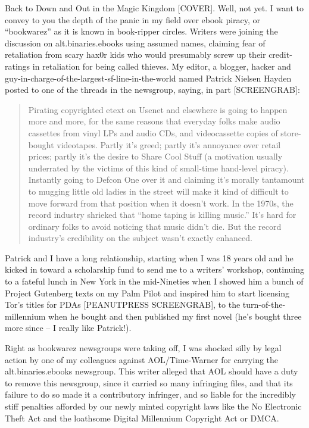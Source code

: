 Back to Down and Out in the Magic Kingdom [COVER]. Well, not yet. I
want to convey to you the depth of the panic in my field over ebook
piracy, or ``bookwarez'' as it is known in book-ripper circles.
Writers were joining the discussion on alt.binaries.ebooks using
assumed names, claiming fear of retaliation from scary hax0r kids
who would presumably screw up their credit-ratings in retaliation
for being called thieves. My editor, a blogger, hacker and
guy-in-charge-of-the-largest-sf-line-in-the-world named Patrick
Nielsen Hayden posted to one of the threads in the newsgroup,
saying, in part [SCREENGRAB]:

\begin{quote}
Pirating copyrighted etext on Usenet and elsewhere is going to
happen more and more, for the same reasons that everyday folks make
audio cassettes from vinyl LPs and audio CDs, and videocassette
copies of store-bought videotapes. Partly it's greed; partly it's
annoyance over retail prices; partly it's the desire to Share Cool
Stuff (a motivation usually underrated by the victims of this kind
of small-time hand-level piracy). Instantly going to Defcon One
over it and claiming it's morally tantamount to mugging little old
ladies in the street will make it kind of difficult to move forward
from that position when it doesn't work. In the 1970s, the record
industry shrieked that ``home taping is killing music.'' It's hard
for ordinary folks to avoid noticing that music didn't die. But the
record industry's credibility on the subject wasn't exactly
enhanced.
\end{quote}

Patrick and I have a long relationship, starting when I was 18
years old and he kicked in toward a scholarship fund to send me to
a writers' workshop, continuing to a fateful lunch in New York in
the mid-Nineties when I showed him a bunch of Project Gutenberg
texts on my Palm Pilot and inspired him to start licensing Tor's
titles for PDAs [PEANUTPRESS SCREENGRAB], to the
turn-of-the-millennium when he bought and then published my first
novel (he's bought three more since -- I really like Patrick!).

Right as bookwarez newsgroups were taking off, I was shocked silly
by legal action by one of my colleagues against AOL/Time-Warner for
carrying the alt.binaries.ebooks newsgroup. This writer alleged
that AOL should have a duty to remove this newsgroup, since it
carried so many infringing files, and that its failure to do so
made it a contributory infringer, and so liable for the incredibly
stiff penalties afforded by our newly minted copyright laws like
the No Electronic Theft Act and the loathsome Digital Millennium
Copyright Act or DMCA.

